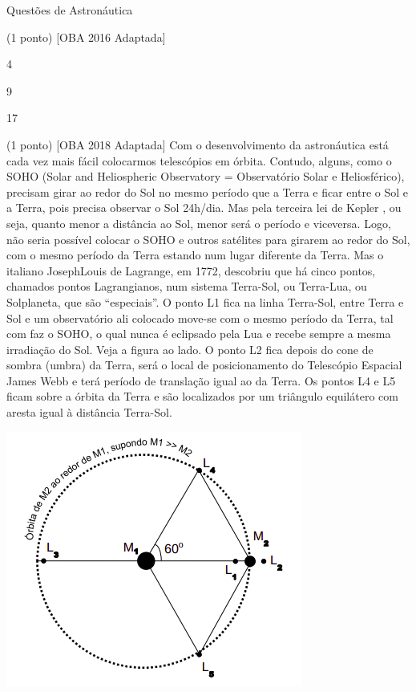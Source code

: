 \documentclass{../lista}
\begin{document}
\begin{secao}{Questões de Astronáutica}
\begin{questao}{(1 ponto) [OBA 2016 Adaptada]}
			\begin{alternativas}
				\item 4
				\item 9
				\item 17
			\end{alternativas}
		\end{questao}
		\begin{questao}{(1 ponto) [OBA 2018 Adaptada]}
			Com o desenvolvimento da astronáutica está cada vez mais fácil colocarmos telescópios em órbita. Contudo, alguns, como o SOHO (Solar and Heliospheric Observatory = Observatório Solar e Heliosférico), precisam girar ao redor do Sol no mesmo período que a Terra e ficar entre o Sol e a Terra, pois precisa observar o Sol 24h/dia. Mas pela terceira lei de Kepler , ou seja, quanto menor a distância ao Sol, menor será o período e viceversa. Logo, não seria possível colocar o SOHO e outros satélites para girarem ao redor do Sol, com o mesmo período da Terra estando num lugar diferente da Terra. Mas o italiano JosephLouis de Lagrange, em 1772, descobriu que há cinco pontos, chamados pontos Lagrangianos, num sistema Terra-Sol, ou Terra-Lua, ou Solplaneta, que são “especiais”. O ponto L1 fica na linha Terra-Sol, entre Terra e Sol e um observatório ali colocado move-se com o mesmo período da Terra, tal com faz o SOHO, o qual nunca é eclipsado pela Lua e recebe sempre a mesma irradiação do Sol. Veja a figura ao lado. O ponto L2 fica depois do cone de sombra (umbra) da Terra, será o local de posicionamento do Telescópio Espacial James Webb e terá período de translação igual ao da Terra. Os pontos L4 e L5 ficam sobre a órbita da Terra e são localizados por um triângulo equilátero com aresta igual à distância Terra-Sol.
			
			\begin{center}
				\includegraphics[height=.75\linewidth]{./img/10.png}
			\end{center}
			

\end{questao}
\end{secao}
\end{document}

